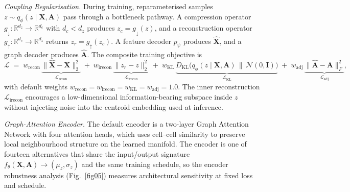 \documentclass[referee, pdflatex, sn-vancouver-num]{sn-jnl}
\begin{document}
\textit{Coupling Regularisation.} During training, reparameterised samples $z\sim q_\phi(z\mid\mathbf{X},\mathbf{A})$ pass through a bottleneck pathway. A compression operator $g_\downarrow:\mathbb{R}^{d_z}\!\to\!\mathbb{R}^{d_c}$ with $d_c<d_z$ produces $z_c=g_\downarrow(z)$, and a reconstruction operator $g_\uparrow:\mathbb{R}^{d_c}\!\to\!\mathbb{R}^{d_z}$ returns $z_r=g_\uparrow(z_c)$. A feature decoder $p_\psi$ produces $\hat{\mathbf{X}}$, and a graph decoder produces $\hat{\mathbf{A}}$. The composite training objective is
\begin{equation}
\mathcal{L}
\;=\;
w_{\text{recon}}\,\underbrace{\bigl\lVert\hat{\mathbf{X}}-\mathbf{X}\bigr\rVert_{2}^{2}}_{\mathcal{L}_{\text{recon}}}
\;+\;
w_{\text{irecon}}\,\underbrace{\bigl\lVert z_r - z\bigr\rVert_{2}^{2}}_{\mathcal{L}_{\text{irecon}}}
\;+\;
w_{\text{KL}}\,\underbrace{D_{\text{KL}}\!\bigl(q_\phi(z\mid\mathbf{X},\mathbf{A})\,\big\|\,\mathcal{N}(0,\mathbf{I})\bigr)}_{\mathcal{L}_{\text{KL}}}
\;+\;
w_{\text{adj}}\,\underbrace{\bigl\lVert\hat{\mathbf{A}}-\mathbf{A}\bigr\rVert_{F}^{2}}_{\mathcal{L}_{\text{adj}}},
\label{eq:loss}
\end{equation}
with default weights $w_{\text{recon}}=w_{\text{irecon}}=w_{\text{KL}}=w_{\text{adj}}=1.0$. The inner reconstruction $\mathcal{L}_{\text{irecon}}$ encourages a low-dimensional information-bearing subspace inside $z$ without injecting noise into the centroid embedding used at inference.

\textit{Graph-Attention Encoder.} The default encoder is a two-layer Graph Attention Network with four attention heads, which uses cell--cell similarity to preserve local neighbourhood structure on the learned manifold. The encoder is one of fourteen alternatives that share the input/output signature $f_\theta(\mathbf{X},\mathbf{A})\rightarrow(\mu_z,\sigma_z)$ and the same training schedule, so the encoder robustness analysis (Fig.~\ref{fig05}) measures architectural sensitivity at fixed loss and schedule.
\end{document}
